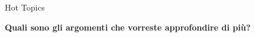 \begin{frame}{Hot Topics}

\begin{center}
    \huge{\textbf{Quali sono gli argomenti che vorreste approfondire di pi\`u?}}
\end{center}

\end{frame}